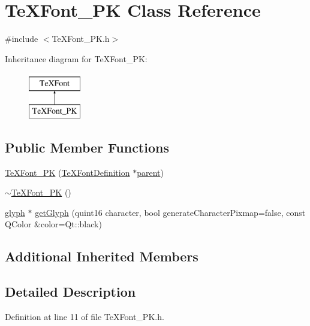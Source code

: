 \hypertarget{classTeXFont__PK}{\section{Te\+X\+Font\+\_\+\+P\+K Class Reference}
\label{classTeXFont__PK}
}


{\ttfamily \#include $<$Te\+X\+Font\+\_\+\+P\+K.\+h$>$}

Inheritance diagram for Te\+X\+Font\+\_\+\+P\+K\+:\begin{figure}[H]
\begin{center}
\leavevmode
\includegraphics[height=2.000000cm]{classTeXFont__PK}
\end{center}
\end{figure}
\subsection*{Public Member Functions}
\begin{DoxyCompactItemize}
\item 
\hyperlink{classTeXFont__PK_a9587b31c4e2463725e0e5fbffca3b190}{Te\+X\+Font\+\_\+\+P\+K} (\hyperlink{classTeXFontDefinition}{Te\+X\+Font\+Definition} $\ast$\hyperlink{classTeXFont_a72d8eb1f0377749cf4a45dfabf1c3dd5}{parent})
\item 
\hyperlink{classTeXFont__PK_aebece9fccf3f024c72879373767a2fb4}{$\sim$\+Te\+X\+Font\+\_\+\+P\+K} ()
\item 
\hyperlink{classglyph}{glyph} $\ast$ \hyperlink{classTeXFont__PK_a0c2859ee4b390f91e8fa73e8a77e89e0}{get\+Glyph} (quint16 character, bool generate\+Character\+Pixmap=false, const Q\+Color \&color=Qt\+::black)
\end{DoxyCompactItemize}
\subsection*{Additional Inherited Members}


\subsection{Detailed Description}


Definition at line 11 of file Te\+X\+Font\+\_\+\+P\+K.\+h.



